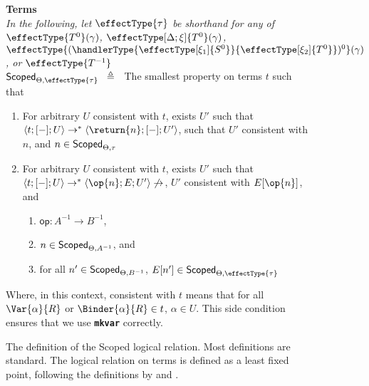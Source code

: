 \begin{figure}
\begin{rec-desc}
\textbf{Terms}\\
{\scriptsize{\textit{In the following, let $\effectType{\tau}$ be shorthand for any of $\effectType{T^{0}} (\gamma)$, $\effectType[\Delta; \xi]{T^{0}} (\gamma)$, $\effectType{(\handlerType{\effectType[\xi_1]{S^0}}{\effectType[\xi_2]{T^0}})^{0}} (\gamma)$, or $\effectType{T^{-1}}$}}}\\

$\scoped{\effectType{\tau}} \hspace{2mm} \triangleq \hspace{2mm}$ The smallest property on terms $t$ such that 
\begin{enumerate}
  \item For arbitrary $U$ consistent with $t$, exists $U'$ such that $\langle t;[-];U \rangle \to^{*} \langle \return{n}; [-]; U' \rangle$, such that $U'$ consistent with $n$, and $n \in \textsf{Scoped}_{{\Theta}, {\tau}}$ 
  \item For arbitrary $U$ consistent with $t$, exists $U'$ such that $\langle t;[-];U \rangle \to^{*} \langle \op{n}; E; U' \rangle \not\to$, $U'$ consistent with $E[\op{n}]$, and 
  \begin{enumerate}
    \item $\textsf{op}: A^{-1} \to B^{-1}$,
    \item $n \in \textsf{Scoped}_{{\Theta}, {A^{-1}}}$, and 
    \item for all $n' \in \textsf{Scoped}_{{\Theta}, {B^{-1}}}$, $E[n'] \in \scoped{\effectType{\tau}}$
  \end{enumerate}
\end{enumerate}
Where, in this context, consistent with $t$ means that for all $\Var{\alpha}{R}$ or $\Binder{\alpha}{R} \in t$, $\alpha \in U$. This side condition ensures that we use \textbf{\texttt{mkvar}} correctly.
\end{rec-desc}
\caption{The definition of the \textsf{Scoped} logical relation. Most definitions are standard. The logical relation on terms is defined as a least fixed point, following the definitions by \citet{plotkin-2025} and \citet{kuchta-2023}.}
\label{fig:logical-relation-defn}
\end{figure}

